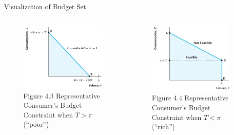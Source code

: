 \documentclass[11pt,aspectratio=43]{beamer}
\theoremstyle{definition}
\begin{document}
\begin{frame}{Visualization of Budget Set}
\label{slide:Visualization_of_Budget_Set}
    \begin{columns}
        \begin{column}{0.5\textwidth}
            \begin{figure}
                \caption{Figure 4.3 Representative Consumer's Budget Constraint when $ T > \pi $ (``poor'')}
                \includegraphics[width=\textwidth]{./figures/Figure4_3.jpg}
            \end{figure}
        \end{column}
        \begin{column}{0.5\textwidth}
            \begin{figure}
                \caption{Figure 4.4 Representative Consumer's Budget Constraint when $ T < \pi $ (``rich'')}
                \includegraphics[width=\textwidth]{./figures/Figure4_4.jpg}
            \end{figure}
        \end{column}
    \end{columns}
\end{frame}
\end{document}
